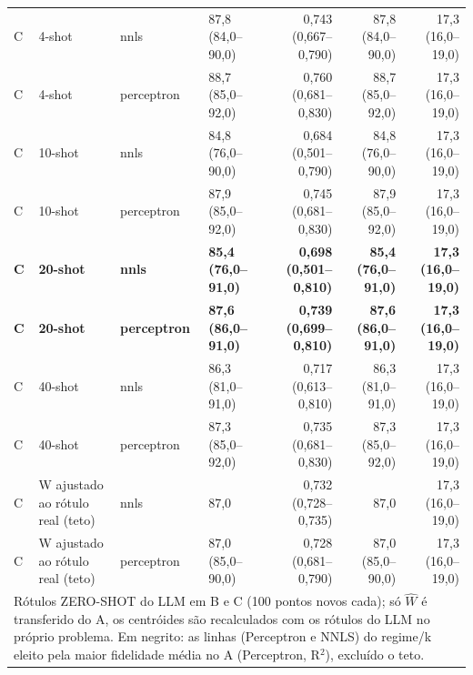 \begin{table}[htbp]
\begin{tabular}{llllrrr}
C & 4-shot & nnls & 87,8 (84,0–90,0) & 0,743 (0,667–0,790) & 87,8 (84,0–90,0) & 17,3 (16,0–19,0) \\
C & 4-shot & perceptron & 88,7 (85,0–92,0) & 0,760 (0,681–0,830) & 88,7 (85,0–92,0) & 17,3 (16,0–19,0) \\
C & 10-shot & nnls & 84,8 (76,0–90,0) & 0,684 (0,501–0,790) & 84,8 (76,0–90,0) & 17,3 (16,0–19,0) \\
C & 10-shot & perceptron & 87,9 (85,0–92,0) & 0,745 (0,681–0,830) & 87,9 (85,0–92,0) & 17,3 (16,0–19,0) \\
\textbf{C} & \textbf{20-shot} & \textbf{nnls} & \textbf{85,4 (76,0–91,0)} & \textbf{0,698 (0,501–0,810)} & \textbf{85,4 (76,0–91,0)} & \textbf{17,3 (16,0–19,0)} \\
\textbf{C} & \textbf{20-shot} & \textbf{perceptron} & \textbf{87,6 (86,0–91,0)} & \textbf{0,739 (0,699–0,810)} & \textbf{87,6 (86,0–91,0)} & \textbf{17,3 (16,0–19,0)} \\
C & 40-shot & nnls & 86,3 (81,0–91,0) & 0,717 (0,613–0,810) & 86,3 (81,0–91,0) & 17,3 (16,0–19,0) \\
C & 40-shot & perceptron & 87,3 (85,0–92,0) & 0,735 (0,681–0,830) & 87,3 (85,0–92,0) & 17,3 (16,0–19,0) \\
C & W ajustado ao rótulo real (teto) & nnls & 87,0 & 0,732 (0,728–0,735) & 87,0 & 17,3 (16,0–19,0) \\
C & W ajustado ao rótulo real (teto) & perceptron & 87,0 (85,0–90,0) & 0,728 (0,681–0,790) & 87,0 (85,0–90,0) & 17,3 (16,0–19,0) \\
\bottomrule
\multicolumn{7}{p{0.95\linewidth}}{\footnotesize Rótulos ZERO-SHOT do LLM em B e C (100 pontos novos cada); só $\hat{W}$ é transferido do A, os centróides são recalculados com os rótulos do LLM no próprio problema. Em negrito: as linhas (Perceptron e NNLS) do regime/k eleito pela maior fidelidade média no A (Perceptron, R$^2$), excluído o teto.} \\
\end{tabular}
\end{table}
